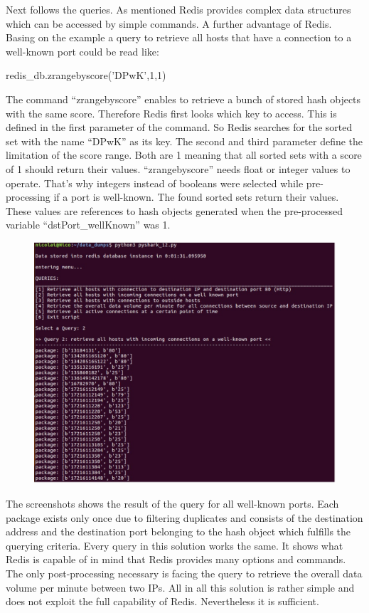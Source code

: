 Next follows the queries. As mentioned Redis provides complex data structures which can be accessed by simple commands. A further advantage of Redis. Basing on the example a query to retrieve all hosts that have a connection to a well-known port could be read like:

redis_db.zrangebyscore('DPwK',1,1)

The command “zrangebyscore” enables to retrieve a bunch of stored hash objects with the same score. Therefore Redis first looks which key to access. This is defined in the first parameter of the command. So Redis searches for the sorted set with the name “DPwK” as its key. The second and third parameter define the limitation of the score range. Both are 1 meaning that all sorted sets with a score of 1 should return their values. “zrangebyscore” needs float or integer values to operate. That’s why integers instead of booleans were selected while pre-processing if a port is well-known. The found sorted sets return their values. These values are references to hash objects generated when the pre-processed variable “dstPort_wellKnown” was 1. 

\begin{figure}[htb!]
	\centerline{\includegraphics[width=1.0\textwidth]{resources/solution3-3.png}}
\end{figure}

The screenshots shows the result of the query for all well-known ports. Each package exists only once due to filtering duplicates and consists of the destination address and the destination port belonging to the hash object which fulfills the querying criteria.
Every query in this solution works the same. It shows what Redis is capable of in mind that Redis provides many options and commands. The only post-processing necessary is facing the query to retrieve the overall data volume per minute between two IPs. All in all this solution is rather simple and does not exploit the full capability of Redis. Nevertheless it is sufficient.
